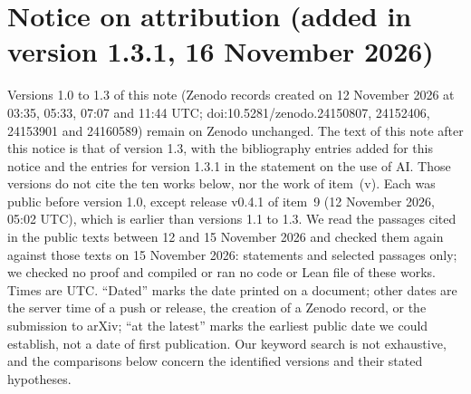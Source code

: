 \documentclass[11pt,a4paper]{article}
\theoremstyle{plain}
\theoremstyle{definition}
\theoremstyle{remark}
\numberwithin{equation}{section}
\newcommand{\VDATE}{16 November 2026}%
\begin{document}
\begin{abstract}
\emph{Version 1.3.2 (\VDATE).} Replaces the proof of Lemma~\ref{lem:C}(c) by a complete argument (explicit chart, exact inequalities, no Taylor expansion), without changing the statements of the lemma and of Theorem~\ref{thm:L}; outside that paragraph and one sentence of the status paragraph of Section~\ref{sec:fixed} that described the earlier argument, the body of the note is that of version 1.3.
\end{abstract}

\section*{Notice on attribution (added in version 1.3.1, 16 November 2026)}\label{sec:notice}
\begingroup\footnotesize\setlength{\parindent}{0pt}\setlength{\parskip}{2pt}\setlength{\emergencystretch}{3em}
\newcommand{\nitem}[1]{\par\noindent\hangindent=1.3em\hangafter=1 \makebox[1.3em][l]{#1}}
Versions 1.0 to 1.3 of this note (Zenodo records created on 12 November 2026 at 03:35, 05:33, 07:07 and 11:44 UTC;
doi:10.5281/zenodo.24150807, 24152406, 24153901 and 24160589) remain on Zenodo unchanged. The text of this note after this
notice is that of version 1.3, with the bibliography entries added for this notice and the entries for version 1.3.1 in the statement on the use of AI. Those versions do not cite the ten works below, nor the work of item~(v). Each was public before version 1.0, except release v0.4.1 of item~9 (12 November 2026, 05:02 UTC), which is earlier than versions 1.1 to 1.3.
We read the passages cited in the public texts between 12 and 15 November 2026 and checked them again against those texts on 15 November 2026: statements and selected
passages only; we checked no proof and compiled or ran no code or Lean file of these works. Times are UTC. ``Dated'' marks the date printed on a document; other dates are the server time of a push or release, the creation of a Zenodo record, or the submission to arXiv; ``at the latest'' marks the earliest public date we could establish, not a date of first publication. Our keyword search is not exhaustive, and the comparisons below concern the identified versions and their stated hypotheses.
\end{document}
